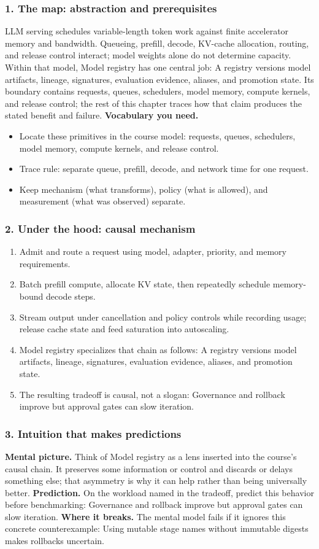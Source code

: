 \subsubsection*{1. The map: abstraction and prerequisites}
LLM serving schedules variable-length token work against finite accelerator memory and bandwidth. Queueing, prefill, decode, KV-cache allocation, routing, and release control interact; model weights alone do not determine capacity.
Within that model, Model registry has one central job: A registry versions model artifacts, lineage, signatures, evaluation evidence, aliases, and promotion state. Its boundary contains requests, queues, schedulers, model memory, compute kernels, and release control; the rest of this chapter traces how that claim produces the stated benefit and failure.
\textbf{Vocabulary you need.}\begin{itemize}
\item Locate these primitives in the course model: requests, queues, schedulers, model memory, compute kernels, and release control.
\item Trace rule: separate queue, prefill, decode, and network time for one request.
\item Keep mechanism (what transforms), policy (what is allowed), and measurement (what was observed) separate.
\end{itemize}
\subsubsection*{2. Under the hood: causal mechanism}\begin{enumerate}
\item Admit and route a request using model, adapter, priority, and memory requirements.
\item Batch prefill compute, allocate KV state, then repeatedly schedule memory-bound decode steps.
\item Stream output under cancellation and policy controls while recording usage; release cache state and feed saturation into autoscaling.
\item Model registry specializes that chain as follows: A registry versions model artifacts, lineage, signatures, evaluation evidence, aliases, and promotion state.
\item The resulting tradeoff is causal, not a slogan: Governance and rollback improve but approval gates can slow iteration.
\end{enumerate}
\subsubsection*{3. Intuition that makes predictions}
\textbf{Mental picture.} Think of Model registry as a lens inserted into the course's causal chain. It preserves some information or control and discards or delays something else; that asymmetry is why it can help rather than being universally better.
\textbf{Prediction.} On the workload named in the tradeoff, predict this behavior before benchmarking: Governance and rollback improve but approval gates can slow iteration.
\textbf{Where it breaks.} The mental model fails if it ignores this concrete counterexample: Using mutable stage names without immutable digests makes rollbacks uncertain.
